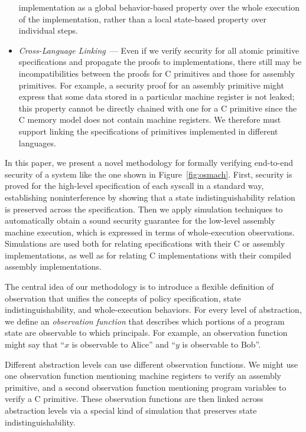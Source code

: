 \begin{itemize}
implementation as a global behavior-based property over the whole 
execution of the implementation, rather than a local state-based 
property over individual steps.
\item \emph{Cross-Language Linking}~--- Even if we verify security
for all atomic primitive specifications and propagate 
the proofs to implementations, there still may be incompatibilities
between the proofs for C primitives and those for assembly 
primitives. For example, a security proof for an assembly primitive 
might express that some data stored in a particular machine register 
is not leaked; this property cannot be directly chained with one for a 
C primitive since the C memory model does not contain 
machine registers. We therefore must support linking the
specifications of primitives implemented in different languages.
\end{itemize}
In this paper, we present a novel methodology
for formally verifying end-to-end security of a system like the one
shown in Figure~\ref{fig:osmach}. First, security is proved for the
high-level specification of each syscall 
in a standard way, establishing noninterference
by showing that a state indistinguishability relation is preserved
across the specification. Then
we apply simulation techniques to automatically obtain a
sound security guarantee for the low-level assembly machine
execution, which is expressed in terms of whole-execution 
observations. Simulations are used both for relating specifications
with their C or assembly implementations, as well as for relating C 
implementations with their compiled assembly implementations.

The central idea of our methodology is to introduce a 
flexible definition of observation that unifies the concepts of 
policy specification, state indistinguishability, and 
whole-execution behaviors. For every level of abstraction, we 
define an \emph{observation function}
that %
describes which portions of a program state are 
observable to which principals. For
example, an observation function might say that ``$x$ is 
observable to Alice'' and ``$y$ is observable to Bob''.

Different abstraction levels can use different observation functions.
We might use one observation function mentioning machine registers to 
verify an assembly primitive, and a second observation function
mentioning program variables to verify a C primitive. These
observation functions are then linked across abstraction levels via
a special kind of simulation that preserves state
indistinguishability.


